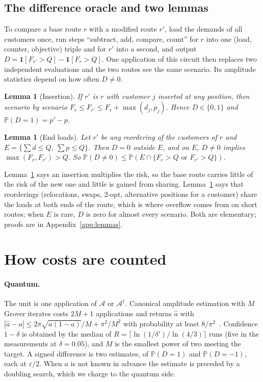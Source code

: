 \documentclass[pdflatex,sn-mathphys-num]{sn-jnl}
\theoremstyle{thmstyleone}
\newtheorem{lemma}[theorem]{Lemma}
\theoremstyle{thmstyletwo}
\renewcommand{\P}{\mathbb{P}}
\begin{document}
\subsection{The difference oracle and two lemmas}
To compare a base route $r$ with a modified route $r'$, load the demands of all customers once, run steps ``subtract, add, compare, count'' for $r$ into one (load, counter, objective) triple and for $r'$ into a second, and output $D=\mathbf 1[F_{r'}>Q]-\mathbf 1[F_r>Q]$. One application of this circuit then replaces two independent evaluations and the two routes see the same scenario. Its amplitude statistics depend on how often $D\ne0$.

\begin{lemma}[Insertion]\label{lem:insertion}
If $r'$ is $r$ with customer $j$ inserted at any position, then scenario by scenario $F_r\le F_{r'}\le F_r+\max(d_j,p_j)$. Hence $D\in\{0,1\}$ and $\P(D=1)=p'-p$.
\end{lemma}

\begin{lemma}[End loads]\label{lem:endload}
Let $r'$ be any reordering of the customers of $r$ and $E=\{\sum d\le Q,\ \sum p\le Q\}$. Then $D=0$ outside $E$, and on $E$, $D\ne0$ implies $\max(F_r,F_{r'})>Q$. So $\P(D\ne0)\le\P(E\cap\{F_r>Q\text{ or }F_{r'}>Q\})$.
\end{lemma}

Lemma~\ref{lem:insertion} says an insertion multiplies the risk, so the base route carries little of the risk of the new one and little is gained from sharing. Lemma~\ref{lem:endload} says that reorderings (relocations, swaps, 2-opt, alternative positions for a customer) share the loads at both ends of the route, which is where overflow comes from on short routes; when $E$ is rare, $D$ is zero for almost every scenario. Both are elementary; proofs are in Appendix~\ref{app:lemmas}.

\section{How costs are counted}\label{sec:counting}

\paragraph{Quantum.} The unit is one application of $\mathcal A$ or $\mathcal A^\dagger$. Canonical amplitude estimation with $M$ Grover iterates costs $2M+1$ applications and returns $\hat a$ with $|\hat a-a|\le 2\pi\sqrt{a(1-a)}/M+\pi^2/M^2$ with probability at least $8/\pi^2$~\cite{Brassard2002}. Confidence $1-\delta$ is obtained by the median of $R=\lceil\ln(1/\delta')/\ln(4/3)\rceil$ runs (five in the measurements at $\delta=0.05$), and $M$ is the smallest power of two meeting the target. A signed difference is two estimates, of $\P(D=1)$ and $\P(D=-1)$, each at $\varepsilon/2$. When $a$ is not known in advance the estimate is preceded by a doubling search, which we charge to the quantum side.
\end{document}
